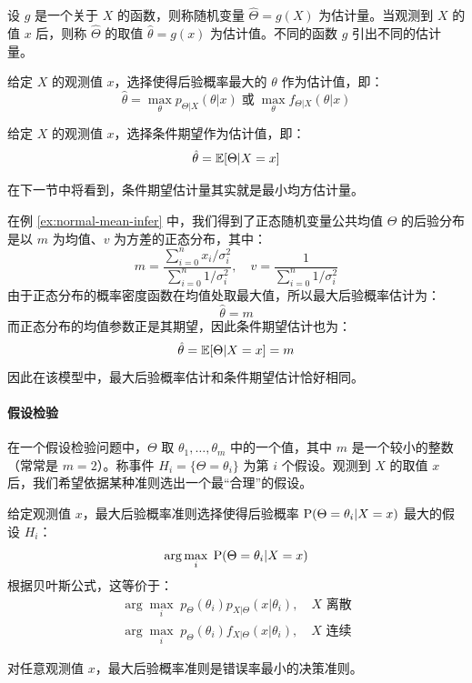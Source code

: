 \begin{definition}
设 $g$ 是一个关于 $X$ 的函数，则称随机变量 $\hat\Theta=g(X)$ 为估计量。当观测到 $X$ 的值 $x$ 后，则称 $\hat\Theta$ 的取值 $\hat\theta=g(x)$ 为估计值。不同的函数 $g$ 引出不同的估计量。
\end{definition}

\begin{definition}[最大后验概率估计量]
给定 $X$ 的观测值 $x$，选择使得后验概率最大的 $\theta$ 作为估计值，即：
\[
\hat\theta=\max_\theta p_{\Theta\vert X}(\theta\vert x)\;\text{或}\;\max_\theta f_{\Theta\vert X}(\theta\vert x)
\]
\end{definition}

\begin{definition}[条件期望估计量]
给定 $X$ 的观测值 $x$，选择条件期望作为估计值，即：
\[
\hat\theta=\mathbb{E}[\Theta\vert X=x]
\]
\end{definition}
\begin{com}
在下一节中将看到，条件期望估计量其实就是最小均方估计量。
\end{com}

\begin{example}[正态随机变量公共均值的估计量]
\label{ex:normal-mean-estimate}
在例 \ref{ex:normal-mean-infer} 中，我们得到了正态随机变量公共均值 $\Theta$ 的后验分布是以 $m$ 为均值、$v$ 为方差的正态分布，其中：
\[
m=\frac{\sum_{i=0}^nx_i/\sigma_i^2}{\sum_{i=0}^n1/\sigma_i^2},\quad v=\frac{1}{\sum_{i=0}^n1/\sigma_i^2}
\]
由于正态分布的概率密度函数在均值处取最大值，所以最大后验概率估计为：
\[
\hat\theta=m
\]
而正态分布的均值参数正是其期望，因此条件期望估计也为：
\[
\hat\theta=\mathbb{E}[\Theta\vert X=x]=m
\]
因此在该模型中，最大后验概率估计和条件期望估计恰好相同。
\end{example}

\paragraph{假设检验}
在一个假设检验问题中，$\Theta$ 取 $\theta_1,\ldots,\theta_m$ 中的一个值，其中 $m$ 是一个较小的整数（常常是 $m=2$）。称事件 $H_i=\{\Theta=\theta_i\}$ 为第 $i$ 个假设。观测到 $X$ 的取值 $x$ 后，我们希望依据某种准则选出一个最“合理”的假设。

\begin{definition}[假设检验的最大后验概率准则]
给定观测值 $x$，最大后验概率准则选择使得后验概率 $\mathrm{P}(\Theta=\theta_i\vert X=x)$ 最大的假设 $H_i$：
\[
\arg\max_i\;\mathrm{P}(\Theta=\theta_i\vert X=x)
\]
根据贝叶斯公式，这等价于：
\begin{gather*}
    \arg\max_i\;p_\Theta(\theta_i)p_{X\vert\Theta}(x\vert\theta_i),\quad\text{$X$ 离散}\\
    \arg\max_i\;p_\Theta(\theta_i)f_{X\vert\Theta}(x\vert\theta_i),\quad\text{$X$ 连续}
\end{gather*}
\end{definition}
\begin{com}
对任意观测值 $x$，最大后验概率准则是错误率最小的决策准则。
\end{com}


